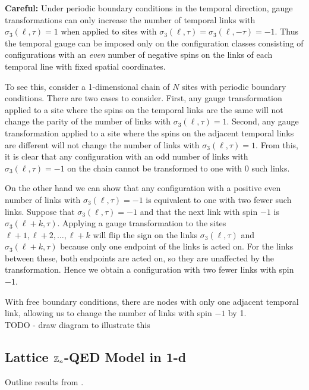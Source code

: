 \documentclass[11pt,reqno]{amsart}
\begin{document}
	\textbf{Careful:} Under periodic boundary conditions in the temporal direction, gauge transformations can only increase the number of temporal links with $\sigma_3(\ell,\tau)=1$ when applied to sites with $\sigma_3(\ell,\tau)=\sigma_3(\ell,-\tau)=-1$.
	Thus the temporal gauge can be imposed only on the configuration classes consisting of configurations with an \emph{even} number of negative spins on the links of each temporal line with fixed spatial coordinates.
	
	To see this, consider a 1-dimensional chain of $N$ sites with periodic boundary conditions. 
	There are two cases to consider.
	First, any gauge transformation applied to a site where the spins on the temporal links are the same will not change the parity of the number of links with $\sigma_3(\ell,\tau)=1$.
	Second, any gauge transformation applied to a site where the spins on the adjacent temporal links are different will not change the number of links with $\sigma_3(\ell,\tau)=1$.
	From this, it is clear that any configuration with an odd number of links with $\sigma_3(\ell,\tau)=-1$ on the chain cannot be transformed to one with 0 such links.
	
	On the other hand we can show that any configuration with a positive even number of links with $\sigma_3(\ell,\tau)=-1$ is equivalent to one with two fewer such links.
	Suppose that $\sigma_3(\ell,\tau)=-1$ and that the next link with spin $-1$ is $\sigma_3(\ell+k,\tau)$.
	Applying a gauge transformation to the sites $\ell+1,\ell+2,\ldots, \ell+k$ will flip the sign on the links $\sigma_3(\ell,\tau)$ and $\sigma_3(\ell+k,\tau)$ because only one endpoint of the links is acted on.
	For the links between these, both endpoints are acted on, so they are unaffected by the transformation.
	Hence we obtain a configuration with two fewer links with spin $-1$.
	
	With free boundary conditions, there are nodes with only one adjacent temporal link, allowing us to change the number of links with spin $-1$ by 1. \\
	
	TODO - draw diagram to illustrate this
	
	\subsection{Lattice $\mathbb{Z}_n$-QED Model in 1-d}
	
	Outline results from \cite{Ercolessi18,Notarnicola15,Wiese13}.
	
\end{document}
